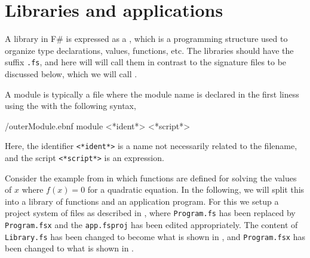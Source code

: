\documentclass[fsharpNotes.tex]{subfiles}
\begin{document}
\section{Libraries and applications}
\label{sec:modules}
A library in F\# is expressed as a , which is a programming structure used to organize type declarations, values, functions, etc. The libraries should have the  suffix \lstinline[language=console]{.fs}, and here will will call them  in contrast to the signature files to be discussed below, which we will call .

A module is typically a file where the module name is declared in the first liness using the  with the following syntax,
%
\begin{verbatimwrite}{\ebnf/outerModule.ebnf}
module <*ident*>
<*script*>
\end{verbatimwrite}
%
Here, the identifier \lstinline[language=syntax]{<*ident*>} is a name not necessarily related to the filename, and the script \lstinline[language=syntax]{<*script*>} is an expression.

Consider the example from  in which functions are defined for solving the values of $x$ where $f(x)=0$ for a quadratic equation. In the following, we will split this into a library of functions and an application program. For this we setup a project system of files as described in , where \lstinline[language=console]{Program.fs} has been replaced by \lstinline[language=console]{Program.fsx} and the \lstinline[language=console]{app.fsproj} has been edited appropriately. The content of  \lstinline[language=console]{Library.fs} has been changed to become what is shown in , 
and \lstinline[language=console]{Program.fsx} has been changed to what is shown in .
\end{document}
